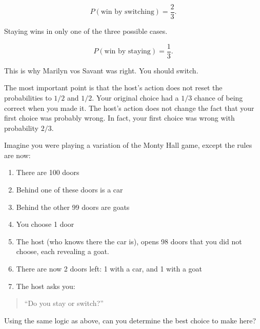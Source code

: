 \documentclass[
  letterpaper,
  DIV=11,
  numbers=noendperiod]{scrreprt}
\providecommand{\tightlist}{%
  \setlength{\itemsep}{0pt}\setlength{\parskip}{0pt}}
\begin{document}
\[
P(\text{win by switching}) = \frac{2}{3}.
\]

Staying wins in only one of the three possible cases.

\[
P(\text{win by staying}) = \frac{1}{3}.
\]

This is why Marilyn vos Savant was right. You should switch.

The most important point is that the host's action does not reset the
probabilities to \(1/2\) and \(1/2\). Your original choice had a \(1/3\)
chance of being correct when you made it. The host's action does not
change the fact that your first choice was probably wrong. In fact, your
first choice was wrong with probability \(2/3\).

\begin{tcolorbox}[enhanced jigsaw, arc=.35mm, bottomrule=.15mm, bottomtitle=1mm, breakable, colback=white, colbacktitle=quarto-callout-note-color!10!white, colframe=quarto-callout-note-color-frame, coltitle=black, left=2mm, leftrule=.75mm, opacityback=0, opacitybacktitle=0.6, rightrule=.15mm, title=\textcolor{quarto-callout-note-color}{\faInfo}\hspace{0.5em}{Bonus Round}, titlerule=0mm, toprule=.15mm, toptitle=1mm]

Imagine you were playing a variation of the Monty Hall game, except the
rules are now:

\begin{enumerate}
\def\labelenumi{\arabic{enumi}.}
\tightlist
\item
  There are 100 doors
\item
  Behind one of these doors is a car
\item
  Behind the other 99 doors are goats
\item
  You choose 1 door
\item
  The host (who knows there the car is), opens 98 doors that you did not
  choose, each revealing a goat.
\item
  There are now 2 doors left: 1 with a car, and 1 with a goat
\item
  The host asks you:
\end{enumerate}

\begin{quote}
``Do you stay or switch?''
\end{quote}

Using the same logic as above, can you determine the best choice to make
here?

\end{tcolorbox}
\end{document}
